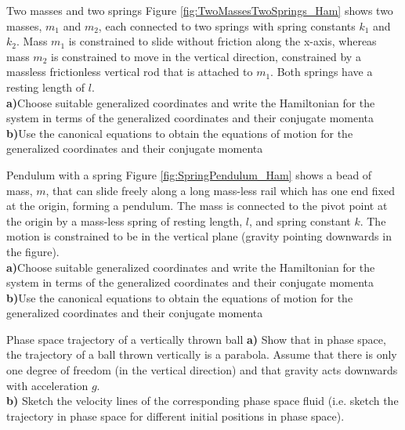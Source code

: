 \begin{problem}{Two masses and two springs}
Figure \ref{fig:TwoMassesTwoSprings_Ham} shows two masses, $m_1$ and $m_2$, each connected to two springs with spring constants $k_1$ and $k_2$. Mass $m_1$ is constrained to slide without friction along the x-axis, whereas mass $m_2$ is constrained to move in the vertical direction, constrained by a massless frictionless vertical rod that is attached to $m_1$. Both springs have a resting length of $l$.
\\
\textbf{a)}Choose suitable generalized coordinates and write the Hamiltonian for the system in terms of the generalized coordinates and their conjugate momenta\\
\textbf{b)}Use the canonical equations to obtain the equations of motion for the generalized coordinates and their conjugate momenta\\
\label{prob_Hamilton_3}
\end{problem}

\begin{problem}{Pendulum with a spring}
Figure \ref{fig:SpringPendulum_Ham} shows a bead of mass, $m$, that can slide freely along a long mass-less rail which has one end fixed at the origin, forming a pendulum. The mass is connected to the pivot point at the origin by a mass-less spring of resting length, $l$, and spring constant $k$. The motion is constrained to be in the vertical plane (gravity pointing downwards in the figure).
\\
\textbf{a)}Choose suitable generalized coordinates and write the Hamiltonian for the system in terms of the generalized coordinates and their conjugate momenta\\
\textbf{b)}Use the canonical equations to obtain the equations of motion for the generalized coordinates and their conjugate momenta\\
\label{prob_Hamilton_4}
\end{problem}

\begin{problem}{Phase space trajectory of a vertically thrown ball}
\textbf{a)} Show that in phase space, the trajectory of a ball thrown vertically is a parabola. Assume that there is only one degree of freedom (in the vertical direction) and that gravity acts downwards with acceleration $g$.\\
\textbf{b)} Sketch the velocity lines of the corresponding phase space fluid (i.e. sketch the trajectory in phase space for different initial positions in phase space).
\label{prob_Hamilton_5}
\end{problem}

